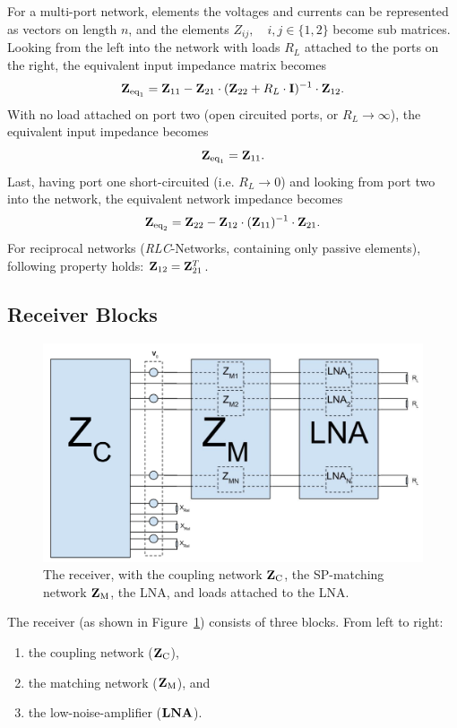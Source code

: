 For a multi-port network, elements the voltages and currents can be represented as vectors on length $n$, and the elements $Z_{ij},\quad i,j\in\{1,2\}$ become sub matrices.
Looking from the left into the network with loads $R_L$ attached to the ports on the right, the equivalent input impedance matrix becomes
\begin{equation}
\label{eq:eq_imp_load}
\mathbf{Z}_{\text{eq}_1} = \mathbf{Z}_{11} - \mathbf{Z}_{21}\cdot(\mathbf{Z}_{22} + R_L\cdot\mathbf{I})^{-1}\cdot \mathbf{Z}_{12}.
\end{equation}
With no load attached on port two (open circuited ports, or $R_L\rightarrow\infty$), the equivalent input impedance becomes
\begin{equation}
\label{eq:eq_imp_oc}
\mathbf{Z}_{\text{eq}_1} = \mathbf{Z}_{11}.
\end{equation}
Last, having port one short-circuited (i.e.  $R_L\rightarrow 0$) and looking from port two into the network, the equivalent network impedance becomes
\begin{equation}
\label{eq:eq_imp_sc}
\mathbf{Z}_{\text{eq}_2} = \mathbf{Z}_{22} - \mathbf{Z}_{12}\cdot(\mathbf{Z}_{11})^{-1}\cdot \mathbf{Z}_{21}.
\end{equation}
For reciprocal networks (\textit{RLC}-Networks, containing only passive elements), following property holds: $\mathbf{Z}_{12} = \mathbf{Z}_{21}^T$.

\subsection{Receiver Blocks}
\begin{figure}[h]
\centering
  \includegraphics[width=0.9\linewidth]{images/Receiver.png}
\caption{The receiver, with the coupling network $\mathbf{Z}_\text{C}$, the SP-matching network $\mathbf{Z}_\text{M}$, the LNA, and loads attached to the LNA.}
\label{fig:receiver}
\end{figure}
The receiver (as shown in Figure~\ref{fig:receiver}) consists of three blocks.
From left to right:
\begin{enumerate}
\item{the coupling network ($\mathbf{Z}_\text{C}$),}
\item{the matching network ($\mathbf{Z}_\text{M}$), and}
\item{the low-noise-amplifier ($\mathbf{LNA}$).}
\end{enumerate}
 
